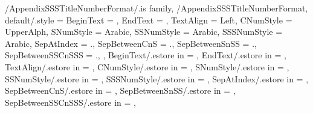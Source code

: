 
\pgfkeys
{
  /AppendixSSSTitleNumberFormat/.is family, /AppendixSSSTitleNumberFormat,
  default/.style =
  {
    BeginText = \empty,
    EndText = \empty,
    TextAlign = {Left},
    CNumStyle = UpperAlph,
    SNumStyle = Arabic,
    SSNumStyle = Arabic,
    SSSNumStyle = Arabic,
    SepAtIndex = {.}, %
    SepBetweenCnS = {.}, %
    SepBetweenSnSS = {.}, %
    SepBetweenSSCnSSS = {.}, %
  },
  BeginText/.estore in = \GetAppendixSSSTitleNumberFormatBeginText,
  EndText/.estore in = \GetAppendixSSSTitleNumberFormatEndText,
  TextAlign/.estore in = \GetAppendixSSSTitleNumberFormatTextAlign,
  CNumStyle/.estore in = \GetAppendixSSSTitleNumberFormatCNumStyle,
  SNumStyle/.estore in = \GetAppendixSSSTitleNumberFormatSNumStyle,
  SSNumStyle/.estore in = \GetAppendixSSSTitleNumberFormatSSNumStyle,
  SSSNumStyle/.estore in = \GetAppendixSSSTitleNumberFormatSSSNumStyle,
  SepAtIndex/.estore in = \GetAppendixSSSTitleNumberFormatSepAtIndex,
  SepBetweenCnS/.estore in = \GetAppendixSSSTitleNumberFormatSepBetweenCnS,
  SepBetweenSnSS/.estore in = \GetAppendixSSSTitleNumberFormatSepBetweenSnSS,
  SepBetweenSSCnSSS/.estore in = \GetAppendixSSSTitleNumberFormatSepBetweenSSCnSSS,
} %

\newcommand\GetAppendixSubSubSectionTitleNumberFormatString{}
\newcommand\SetupAppendixSubSubSectionTitleNumberFormatString
{%
  \SetupTitleNumberFormatString{AppendixSubSubSection}%
  {%
    BeginText=\GetAppendixSSSTitleNumberFormatBeginText,%
    EndText=\GetAppendixSSSTitleNumberFormatEndText,%
    CNumStyle=\GetAppendixSSSTitleNumberFormatCNumStyle,%
    SNumStyle=\GetAppendixSSSTitleNumberFormatSNumStyle,%
    SSNumStyle=\GetAppendixSSSTitleNumberFormatSSNumStyle,%
    SSSNumStyle=\GetAppendixSSSTitleNumberFormatSSSNumStyle,%
    SepAtIndex=\GetAppendixSSSTitleNumberFormatSepAtIndex,%
    SepBetweenCnS=\GetAppendixSSSTitleNumberFormatSepBetweenCnS,%
    SepBetweenSnSS=\GetAppendixSSSTitleNumberFormatSepBetweenSnSS,%
    SepBetweenSSCnSSS=\GetAppendixSSSTitleNumberFormatSepBetweenSSCnSSS,%
    CCounterName=appendixchapter,%
    SCounterName=appendixsection,%
    SSCounterName=appendixsubsection,%
    SSSCounterName=appendixsubsubsection,%
  }{\GetAppendixSubSubSectionTitleNumberFormatString}%
} %


